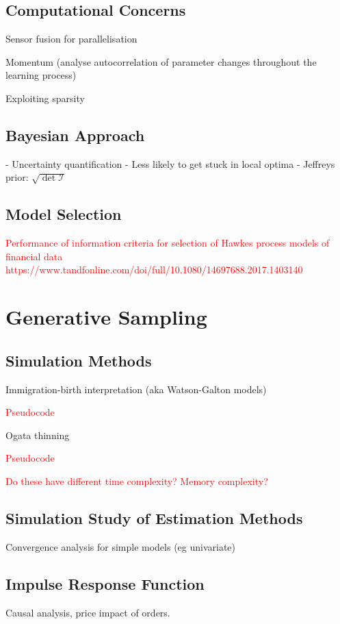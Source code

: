 \documentclass[honours,12pt]{unswthesis}
\numberwithin{equation}{section}
\begin{document}
\section{Computational Concerns}
Sensor fusion for parallelisation

Momentum (analyse autocorrelation of parameter changes throughout the learning process)

Exploiting sparsity \cite{NickelLe}

\section{Bayesian Approach}
- Uncertainty quantification
- Less likely to get stuck in local optima
- Jeffreys prior: $\sqrt{\det \mathcal{I}}$

\section{Model Selection}

\textcolor{red}{Performance of information criteria for selection of Hawkes process models of financial data https://www.tandfonline.com/doi/full/10.1080/14697688.2017.1403140}

\chapter{Generative Sampling}
\section{Simulation Methods}
Immigration-birth interpretation \cite{MorariuPatrichiPakkanen}
(aka Watson-Galton models)

\textcolor{red}{Pseudocode}

Ogata thinning 

\textcolor{red}{Pseudocode}

\textcolor{red}{Do these have different time complexity? Memory complexity?}

\section{Simulation Study of Estimation Methods}
Convergence analysis for simple models (eg univariate)

\section{Impulse Response Function}
Causal analysis, price impact of orders.
\end{document}
